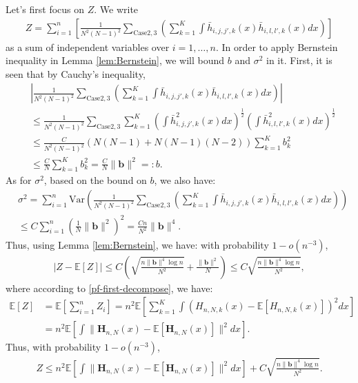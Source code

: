 \documentclass[preprint,11pt]{article}
\newcommand{\mbb}{\mathbb}
\newcommand{\Var}{\text{Var}}
\numberwithin{equation}{section}
\begin{document}
Let's first focus on $Z$. We write
\begin{align*}
    Z=\sum_{i=1}^n\left[\frac{1}{N^2(N-1)^2}\sum_{\text{Case} 2,3}\left(\sum_{k=1}^K\int \bar{h}_{i,j,j',k}(x)\bar{h}_{i,l,l',k}(x)dx\right)\right]
\end{align*}
as a sum of independent variables over $i=1,\ldots,n$. In order to apply Bernstein inequality in Lemma \ref{lem:Bernstein}, we will bound $b$ and $\sigma^2$ in it. First, it is seen that by Cauchy's inequality,
\begin{align*}
    &\left|\frac{1}{N^2(N-1)^2}\sum_{\text{Case} 2,3}\left(\sum_{k=1}^K\int \bar{h}_{i,j,j',k}(x)\bar{h}_{i,l,l',k}(x)dx\right)\right|\\
    &\le \frac{1}{N^2(N-1)^2}\sum_{\text{Case} 2,3}\sum_{k=1}^K\left(\int \bar{h}^2_{i,j,j',k}(x)dx\right)^{\frac{1}{2}} \left(\int \bar{h}^2_{i,l,l',k}(x)dx\right)^{\frac{1}{2}}\\
    &\le \frac{C}{N^2(N-1)^2}(N(N-1)+N(N-1)(N-2))\sum_{k=1}^K b_k^2\\
    &\le \frac{C}{N}\sum_{k=1}^K b_k^2=\frac{C}{N}\|\bm{b}\|^2=:b.
\end{align*}
As for $\sigma^2$, based on the bound on $b$, we also have:
\begin{align*}
    &\sigma^2=\sum_{i=1}^n\Var\left(\frac{1}{N^2(N-1)^2}\sum_{\text{Case} 2,3}\left(\sum_{k=1}^K\int \bar{h}_{i,j,j',k}(x)\bar{h}_{i,l,l',k}(x)dx\right)\right)\\
    &\le C\sum_{i=1}^n\left(\frac{1}{N}\|\bm{b}\|^2\right)^2=\frac{Cn}{N^2}\|\bm{b}\|^4.
\end{align*}
Thus, using Lemma \ref{lem:Bernstein}, we have: with probability $1-o(n^{-3})$,
\begin{align*}
    |Z-\mbb{E}[Z]|\le C\left(\sqrt{\frac{n\|\bm{b}\|^4\log n}{N^2}}+\frac{\|\bm{b}\|^2}{N}\right)\le C\sqrt{\frac{n\|\bm{b}\|^4\log n}{N^2}},
\end{align*}
where according to \eqref{pf-first-decompose}, we have:
\begin{align*}
    \mbb{E}[Z]&=\mbb{E}\left[\sum_{i=1}^n Z_i\right]=n^2\mbb{E}\left[\sum_{k=1}^K\int (H_{n,N,k}(x)-\mbb{E}[H_{n,N,k}(x)])^2dx\right]\\
    &=n^2\mbb{E}\left[\int \|\bm{H}_{n,N}(x)-\mbb{E}[\bm{H}_{n,N}(x)]\|^2dx\right].
\end{align*}
Thus, with probability $1-o(n^{-3})$,
\begin{align*}
    Z\le n^2\mbb{E}\left[\int \|\bm{H}_{n,N}(x)-\mbb{E}[\bm{H}_{n,N}(x)]\|^2dx\right]+C\sqrt{\frac{n\|\bm{b}\|^4\log n}{N^2}}.
\end{align*}
\end{document}
